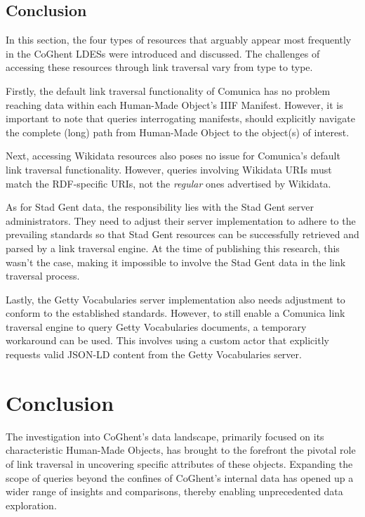 \subsection{Conclusion}

In this section, the four types of resources that arguably appear most frequently in the CoGhent LDESs were introduced and discussed. The challenges of accessing these resources through link traversal vary from type to type.

Firstly, the default link traversal functionality of Comunica has no problem reaching data within each Human-Made Object's IIIF Manifest. However, it is important to note that queries interrogating manifests, should explicitly navigate the complete (long) path from Human-Made Object to the object(s) of interest.

Next, accessing Wikidata resources also poses no issue for Comunica's default link traversal functionality. However, queries involving Wikidata URIs must match the RDF-specific URIs, not the \textit{regular} ones advertised by Wikidata.

As for Stad Gent data, the responsibility lies with the Stad Gent server administrators. They need to adjust their server implementation to adhere to the prevailing standards so that Stad Gent resources can be successfully retrieved and parsed by a link traversal engine. At the time of publishing this research, this wasn't the case, making it impossible to involve the Stad Gent data in the link traversal process.

Lastly, the Getty Vocabularies server implementation also needs adjustment to conform to the established standards. However, to still enable a Comunica link traversal engine to query Getty Vocabularies documents, a temporary workaround can be used. This involves using a custom actor that explicitly requests valid JSON-LD content from the Getty Vocabularies server.

\section{Conclusion}
\label{sec:coghent_link_traversal_conclusion}

The investigation into CoGhent's data landscape, primarily focused on its characteristic Human-Made Objects, has brought to the forefront the pivotal role of link traversal in uncovering specific attributes of these objects. Expanding the scope of queries beyond the confines of CoGhent's internal data has opened up a wider range of insights and comparisons, thereby enabling unprecedented data exploration.

